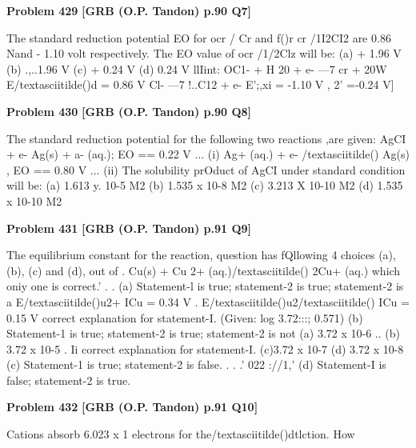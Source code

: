 \begin{problembox}
\textbf{Problem 429} \hfill \textbf{[GRB (O.P. Tandon) p.90 Q7]}
\label{q:ext-grb_all_questions-429}

The standard reduction potential EO for ocr / Cr and f()r 
cr /1I2CI2 are 0.86 Nand - 1.10 volt respectively. The EO 
value of ocr /1/2Clz will be: 
(a) + 1.96 V 
(b) .,..1.96 V 
(c) + 0.24 V 
(d) 
0.24 V 
llIint: 
OC1- + H 20 + e- ---7 cr + 20W 
E/textasciitilde()d = 0.86 V 
Cl- ---7 !..C12 + e-
E';,xi = -1.10 V 
, 
2' 
=-0.24 V]
\end{problembox}

\begin{problembox}
\textbf{Problem 430} \hfill \textbf{[GRB (O.P. Tandon) p.90 Q8]}
\label{q:ext-grb_all_questions-430}

The standard reduction potential for the following two 
reactions ,are given: 
AgCI + e-
Ag(s) + a- (aq.); 
EO == 0.22 V 
... (i) 
Ag+ (aq.) + e- /textasciitilde() 
Ag(s) 
, 
EO == 0.80 V 
... (ii) 
The solubility prOduct of AgCI under standard condition will be: 
(a) 1.613 y. 10-5 M2 
(b) 1.535 x 10-8 M2 
(c) 3.213 X 10-10 M2 
(d) 1.535 x 10-10 M2
\end{problembox}

\begin{problembox}
\textbf{Problem 431} \hfill \textbf{[GRB (O.P. Tandon) p.91 Q9]}
\label{q:ext-grb_all_questions-431}

The equilibrium constant for the reaction, 
question has fQllowing 4 choices (a), (b), (c) and (d), out of 
. Cu(s) + Cu 2+ (aq.)/textasciitilde() 2Cu+ (aq.) 
which oniy one is correct.' 
. 
. 
(a) Statement-l is true; statement-2 is true; statement-2 is a 
E/textasciitilde()u2+ ICu = 0.34 V 
. E/textasciitilde()u2/textasciitilde() ICu = 0.15 V 
correct explanation for statement-I. 
(Given: log 3.72:::; 0.571) 
(b) Statement-1 is true; statement-2 is true; statement-2 is not 
(a) 3.72 x 10-6 
.. 
(b) 3.72 x 10-5 
. 
Ii correct explanation for statement-I. 
(c)3.72 x 10-7 
(d) 3.72 x 10-8 
(c) Statement-1 is true; statement-2 is false. 
. 
. .' 022 
://1,' 
(d) Statement-I is false; statement-2 is true.
\end{problembox}

\begin{problembox}
\textbf{Problem 432} \hfill \textbf{[GRB (O.P. Tandon) p.91 Q10]}
\label{q:ext-grb_all_questions-432}

Cations absorb 6.023 x 1 
electrons for the/textasciitilde()dtlction. How
\end{problembox}

